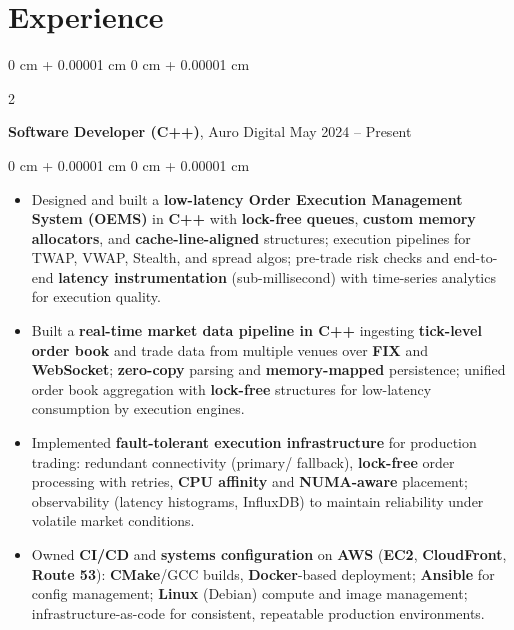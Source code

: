 \documentclass[10pt, letterpaper]{article}
\newenvironment{highlightsjustified}{
    \begin{itemize}[
        topsep=0.10 cm,
        parsep=0.10 cm,
        partopsep=0pt,
        itemsep=0pt,
        leftmargin=0 cm + 10pt
    ]
    \justifying
}{
    \end{itemize}
} %
\newenvironment{onecolentry}{
    \begin{adjustwidth}{
        0 cm + 0.00001 cm
    }{
        0 cm + 0.00001 cm
    }
}{
    \end{adjustwidth}
} %
\newenvironment{twocolentry}[2][]{
    \onecolentry
    \def\secondColumn{#2}
    \setcolumnwidth{\fill, 4.5 cm}
    \begin{paracol}{2}
}{
    \switchcolumn \raggedleft \secondColumn
    \end{paracol}
    \endonecolentry
} %
\begin{document}
    
    
    \section{Experience}



        
        \begin{twocolentry}{
            May 2024 – Present
        }
            \textbf{Software Developer (C++)}, Auro Digital\end{twocolentry}

        \vspace{0.10 cm}
        \begin{onecolentry}

            \begin{highlightsjustified}
                \item Designed and built a \textbf{low-latency Order Execution Management System (OEMS)} in \textbf{C++} with \textbf{lock-free queues}, \textbf{custom memory allocators}, and \textbf{cache-line-aligned} structures; execution pipelines for TWAP, VWAP, Stealth, and spread algos; pre-trade risk checks and end-to-end \textbf{latency instrumentation} (sub-millisecond) with time-series analytics for execution quality.
                \item Built a \textbf{real-time market data pipeline in C++} ingesting \textbf{tick-level order book} and trade data from multiple venues over \textbf{FIX} and \textbf{WebSocket}; \textbf{zero-copy} parsing and \textbf{memory-mapped} persistence; unified order book aggregation with \textbf{lock-free} structures for low-latency consumption by execution engines.
                \item Implemented \textbf{fault-tolerant execution infrastructure} for production trading: redundant connectivity (primary/ fallback), \textbf{lock-free} order processing with retries, \textbf{CPU affinity} and \textbf{NUMA-aware} placement; observability (latency histograms, InfluxDB) to maintain reliability under volatile market conditions.
                \item Owned \textbf{CI/CD} and \textbf{systems configuration} on \textbf{AWS} (\textbf{EC2}, \textbf{CloudFront}, \textbf{Route 53}): \textbf{CMake}/GCC builds, \textbf{Docker}-based deployment; \textbf{Ansible} for config management; \textbf{Linux} (Debian) compute and image management; infrastructure-as-code for consistent, repeatable production environments.
            \end{highlightsjustified}
    
    \end{onecolentry}
\end{document}
